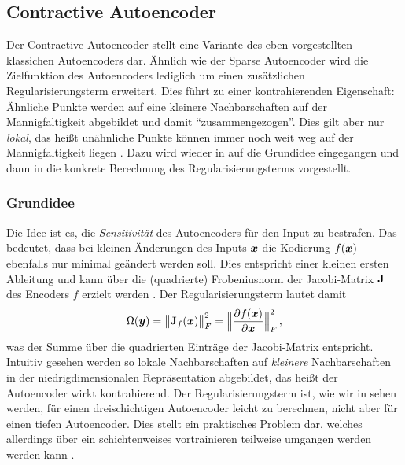 \subsection{Contractive Autoencoder}
\label{ch:MethodenDerDimRed:ML:CAE}

Der Contractive Autoencoder \parencite{Rifai.2011} stellt eine Variante des eben vorgestellten klassichen Autoencoders
 dar. Ähnlich wie der Sparse Autoencoder wird die
Zielfunktion des Autoencoders lediglich um einen zusätzlichen Regularisierungsterm erweitert. Dies
führt zu einer kontrahierenden Eigenschaft: Ähnliche Punkte werden auf eine kleinere
Nachbarschaften auf der Mannigfaltigkeit abgebildet und damit \enquote{zusammengezogen}. Dies gilt
aber nur \textit{lokal}, das heißt unähnliche Punkte können immer noch weit weg auf der
Mannigfaltigkeit liegen \parencite[521]{Goodfellow.2016}. Dazu wird wieder in 
auf die Grundidee eingegangen und dann in 
die konkrete Berechnung des Regularisierungsterms vorgestellt.

\subsubsection{Grundidee}
\label{ch:MethodenDerDimRed:CAE:Grundidee}
Die Idee ist
es, die \textit{Sensitivität} des Autoencoders für den Input zu bestrafen. Das bedeutet, dass bei
kleinen Änderungen des Inputs $\bm{x}$ die Kodierung $f(\bm{x})$ ebenfalls nur minimal geändert
werden soll. Dies entspricht einer kleinen ersten Ableitung und kann über die (quadrierte)
Frobeniusnorm der Jacobi-Matrix $\mathbf{J}$ des Encoders $f$ erzielt werden \parencites[2]{Rifai.2011}[521]{Goodfellow.2016}. Der Regularisierungsterm lautet damit
\begin{equation}
	\label{eq:CAE-Regularisierung}
	\Omega(\vect{y}) = \norm[\big]{\mat{J}_f(\vect{x})}_F^2 =  \norm[\Big]{ \frac{\partial f(\vect{x})}{\partial \vect{x}} }^2_F \, ,
\end{equation}
was der Summe über die quadrierten Einträge der Jacobi-Matrix entspricht. Intuitiv gesehen werden so lokale Nachbarschaften auf \textit{kleinere} Nachbarschaften in der niedrigdimensionalen Repräsentation abgebildet, das heißt der Autoencoder wirkt kontrahierend.
Der Regularisierungsterm ist, wie wir in  sehen werden, für einen dreischichtigen Autoencoder leicht zu berechnen, nicht aber für einen tiefen Autoencoder. Dies stellt ein praktisches Problem dar, welches allerdings über ein schichtenweises vortrainieren teilweise umgangen werden werden kann \parencite[vgl.][522]{Goodfellow.2016}.

